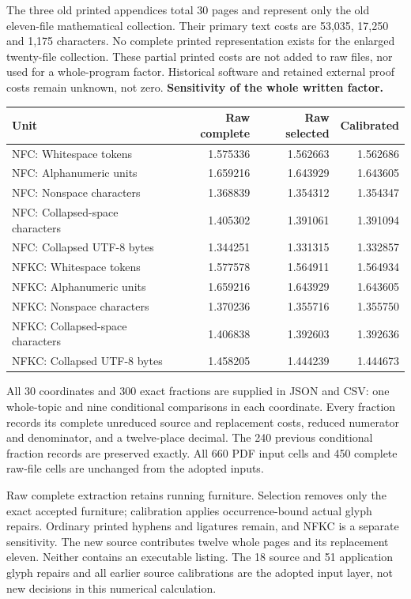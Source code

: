 \documentclass[11pt,a4paper]{article}
\begin{document}
The three old printed appendices total 30 pages and represent only the old eleven-file mathematical collection. Their primary text costs are 53,035, 17,250 and 1,175 characters. No complete printed representation exists for the enlarged twenty-file collection. These partial printed costs are not added to raw files, nor used for a whole-program factor. Historical software and retained external proof costs remain unknown, not zero.
\newpage
\textbf{Sensitivity of the whole written factor.}
\begin{center}\small\begin{tabular}{lrrr}\toprule
Unit & Raw complete & Raw selected & Calibrated\\\midrule
NFC: Whitespace tokens & 1.575336 & 1.562663 & 1.562686\\
NFC: Alphanumeric units & 1.659216 & 1.643929 & 1.643605\\
NFC: Nonspace characters & 1.368839 & 1.354312 & 1.354347\\
NFC: Collapsed-space characters & 1.405302 & 1.391061 & 1.391094\\
NFC: Collapsed UTF-8 bytes & 1.344251 & 1.331315 & 1.332857\\
NFKC: Whitespace tokens & 1.577578 & 1.564911 & 1.564934\\
NFKC: Alphanumeric units & 1.659216 & 1.643929 & 1.643605\\
NFKC: Nonspace characters & 1.370236 & 1.355716 & 1.355750\\
NFKC: Collapsed-space characters & 1.406838 & 1.392603 & 1.392636\\
NFKC: Collapsed UTF-8 bytes & 1.458205 & 1.444239 & 1.444673\\
\bottomrule\end{tabular}\end{center}
All 30 coordinates and 300 exact fractions are supplied in JSON and CSV: one whole-topic and nine conditional comparisons in each coordinate. Every fraction records its complete unreduced source and replacement costs, reduced numerator and denominator, and a twelve-place decimal. The 240 previous conditional fraction records are preserved exactly. All 660 PDF input cells and 450 complete raw-file cells are unchanged from the adopted inputs.

Raw complete extraction retains running furniture. Selection removes only the exact accepted furniture; calibration applies occurrence-bound actual glyph repairs. Ordinary printed hyphens and ligatures remain, and NFKC is a separate sensitivity. The new source contributes twelve whole pages and its replacement eleven. Neither contains an executable listing. The 18 source and 51 application glyph repairs and all earlier source calibrations are the adopted input layer, not new decisions in this numerical calculation.
\end{document}
